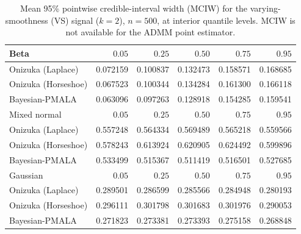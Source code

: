 \begin{table}[!htbp]
\centering
\small
\caption{Mean 95\% pointwise credible-interval width (MCIW) for the varying-smoothness (VS) signal ($k=2$), $n=500$, at interior quantile levels. MCIW is not available for the ADMM point estimator.}
\label{tab:vs_int_mciw}
\begin{tabular}{lrrrrr}
\toprule
Beta & $0.05$ & $0.25$ & $0.50$ & $0.75$ & $0.95$ \\
\midrule
Onizuka (Laplace) & 0.072159 & 0.100837 & 0.132473 & 0.158571 & 0.168685 \\
Onizuka (Horseshoe) & 0.067523 & 0.100344 & 0.134284 & 0.161300 & 0.166118 \\
Bayesian-PMALA & 0.063096 & 0.097263 & 0.128918 & 0.154285 & 0.159541 \\
\midrule
Mixed normal & $0.05$ & $0.25$ & $0.50$ & $0.75$ & $0.95$ \\
\midrule
Onizuka (Laplace) & 0.557248 & 0.564334 & 0.569489 & 0.565218 & 0.559566 \\
Onizuka (Horseshoe) & 0.578243 & 0.613924 & 0.620905 & 0.624492 & 0.599896 \\
Bayesian-PMALA & 0.533499 & 0.515367 & 0.511419 & 0.516501 & 0.527685 \\
\midrule
Gaussian & $0.05$ & $0.25$ & $0.50$ & $0.75$ & $0.95$ \\
\midrule
Onizuka (Laplace) & 0.289501 & 0.286599 & 0.285566 & 0.284948 & 0.280193 \\
Onizuka (Horseshoe) & 0.296111 & 0.301798 & 0.301683 & 0.301976 & 0.290053 \\
Bayesian-PMALA & 0.271823 & 0.273381 & 0.273393 & 0.275158 & 0.268848 \\
\bottomrule
\end{tabular}
\end{table}
